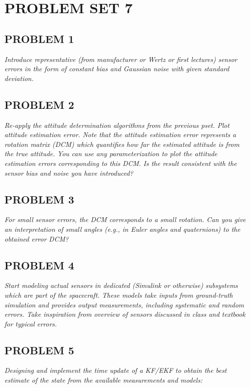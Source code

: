 \section{\Large PROBLEM SET 7}
\subsection{PROBLEM 1}
\textit{Introduce representative (from manufacturer or Wertz or first lectures) sensor errors in the form of constant bias and Gaussian noise with given standard deviation.}

\subsection{PROBLEM 2}
\textit{Re-apply the attitude determination algorithms from the previous pset. Plot attitude estimation error. Note that the attitude estimation error represents a rotation matrix (DCM) which quantifies how far the estimated attitude is from the true attitude. You can use any parameterization to plot the attitude estimation errors corresponding to this DCM. Is the result consistent with the sensor bias and noise you have introduced?}

\subsection{PROBLEM 3}
\textit{For small sensor errors, the DCM corresponds to a small rotation. Can you give an interpretation of small angles (e.g., in Euler angles and quaternions) to the obtained error DCM?}

\subsection{PROBLEM 4}
\textit{Start modeling actual sensors in dedicated (Simulink or otherwise) subsystems which are part of the spacecraft. These models take inputs from ground-truth simulation and provides output measurements, including systematic and random errors. Take inspiration from overview of sensors discussed in class and textbook for typical errors.}

\subsection{PROBLEM 5}
\textit{Designing and implement the time update of a KF/EKF to obtain the best estimate of the state from the available measurements and models:}

